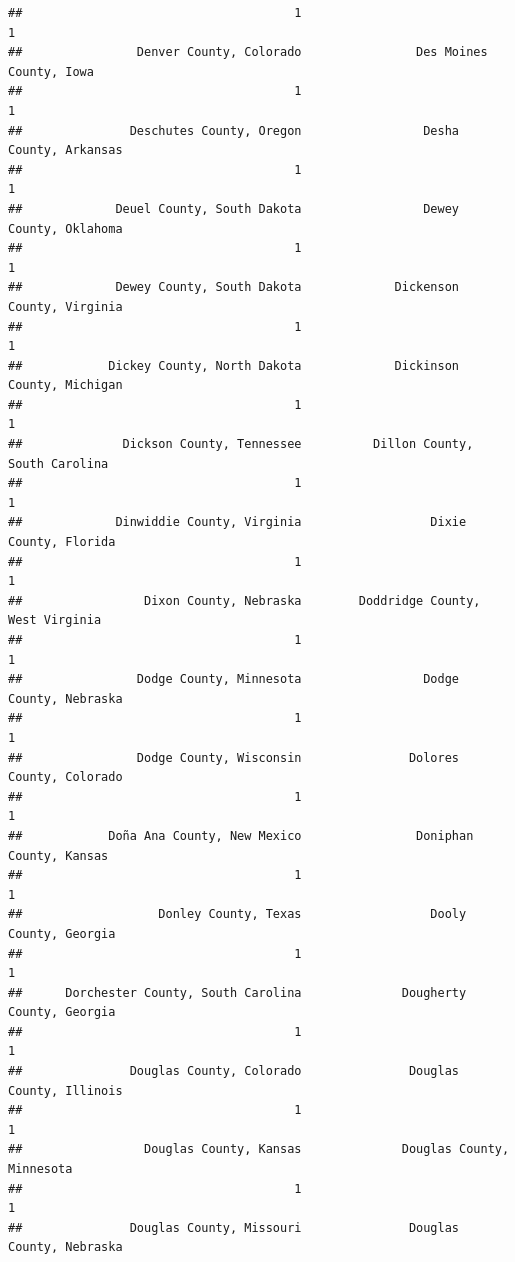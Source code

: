 \documentclass[
]{article}
\begin{document}
\begin{verbatim}
##                                      1                                      1 
##                Denver County, Colorado                Des Moines County, Iowa 
##                                      1                                      1 
##               Deschutes County, Oregon                 Desha County, Arkansas 
##                                      1                                      1 
##             Deuel County, South Dakota                 Dewey County, Oklahoma 
##                                      1                                      1 
##             Dewey County, South Dakota             Dickenson County, Virginia 
##                                      1                                      1 
##            Dickey County, North Dakota             Dickinson County, Michigan 
##                                      1                                      1 
##              Dickson County, Tennessee          Dillon County, South Carolina 
##                                      1                                      1 
##             Dinwiddie County, Virginia                  Dixie County, Florida 
##                                      1                                      1 
##                 Dixon County, Nebraska        Doddridge County, West Virginia 
##                                      1                                      1 
##                Dodge County, Minnesota                 Dodge County, Nebraska 
##                                      1                                      1 
##                Dodge County, Wisconsin               Dolores County, Colorado 
##                                      1                                      1 
##            Doña Ana County, New Mexico                Doniphan County, Kansas 
##                                      1                                      1 
##                   Donley County, Texas                  Dooly County, Georgia 
##                                      1                                      1 
##      Dorchester County, South Carolina              Dougherty County, Georgia 
##                                      1                                      1 
##               Douglas County, Colorado               Douglas County, Illinois 
##                                      1                                      1 
##                 Douglas County, Kansas              Douglas County, Minnesota 
##                                      1                                      1 
##               Douglas County, Missouri               Douglas County, Nebraska 

\end{verbatim}
\end{document}
